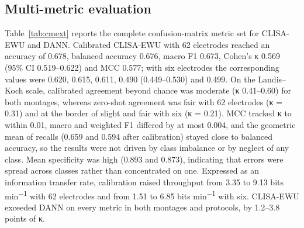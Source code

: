 \subsection{Multi-metric evaluation}
Table~\ref{tab:cmext} reports the complete confusion-matrix metric set for CLISA-EWU and DANN. Calibrated CLISA-EWU with 62 electrodes reached an accuracy of 0.678, balanced accuracy 0.676, macro F1 0.673, Cohen’s κ 0.569 (95\% CI 0.519–0.622) and MCC 0.577; with six electrodes the corresponding values were 0.620, 0.615, 0.611, 0.490 (0.449–0.530) and 0.499. On the Landis–Koch scale\cite{landis}, calibrated agreement beyond chance was moderate (κ 0.41–0.60) for both montages, whereas zero-shot agreement was fair with 62 electrodes (κ = 0.31) and at the border of slight and fair with six (κ = 0.21). MCC tracked κ to within 0.01, macro and weighted F1 differed by at most 0.004, and the geometric mean of recalls (0.659 and 0.594 after calibration) stayed close to balanced accuracy, so the results were not driven by class imbalance or by neglect of any class. Mean specificity was high (0.893 and 0.873), indicating that errors were spread across classes rather than concentrated on one. Expressed as an information transfer rate, calibration raised throughput from 3.35 to 9.13 bits min\textsuperscript{−1} with 62 electrodes and from 1.51 to 6.85 bits min\textsuperscript{−1} with six. CLISA-EWU exceeded DANN on every metric in both montages and protocols, by 1.2–3.8 points of κ.

